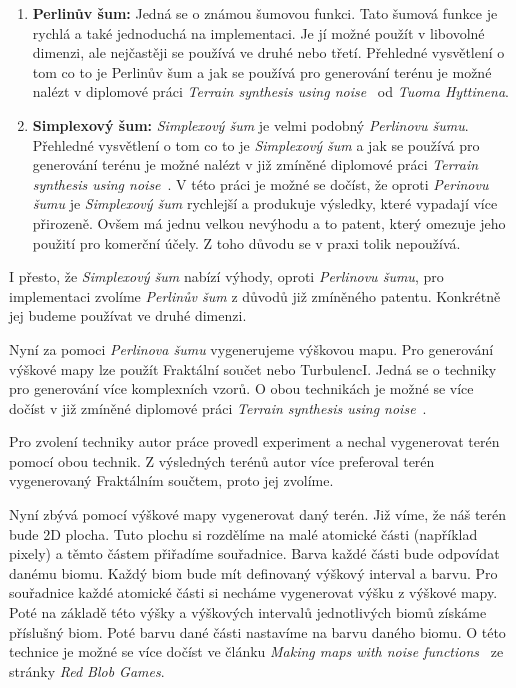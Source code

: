 \begin{enumerate}
    \item \textbf{Perlinův šum:} Jedná se o známou šumovou funkci. Tato šumová funkce je rychlá a také jednoduchá na implementaci. Je jí možné použít v libovolné dimenzi, ale nejčastěji se používá ve druhé nebo třetí. Přehledné vysvětlení o tom co to je Perlinův šum a jak se používá pro generování terénu je možné nalézt v diplomové práci \textit{Terrain synthesis using noise}~\cite{TerrainNoise} od \textit{Tuoma Hyttinena}.

    \item \textbf{Simplexový šum:} \textit{Simplexový šum} je velmi podobný \textit{Perlinovu šumu}. Přehledné vysvětlení o tom co to je \textit{Simplexový šum} a jak se používá pro generování terénu je možné nalézt v již zmíněné diplomové práci \textit{Terrain synthesis using noise}~\cite{TerrainNoise}. V této práci je možné se dočíst, že oproti \textit{Perinovu šumu} je \textit{Simplexový šum} rychlejší a produkuje výsledky, které vypadají více přirozeně. Ovšem má jednu velkou nevýhodu a to patent, který omezuje jeho použití pro komerční účely. Z toho důvodu se v praxi tolik nepoužívá.
\end{enumerate}

I přesto, že \textit{Simplexový šum} nabízí výhody, oproti \textit{Perlinovu šumu}, pro implementaci zvolíme \textit{Perlinův šum} z důvodů již zmíněného patentu. Konkrétně jej budeme používat ve druhé dimenzi.

Nyní za pomoci \textit{Perlinova šumu} vygenerujeme výškovou mapu. Pro generování výškové mapy lze použít Fraktální součet nebo TurbulencI. Jedná se o techniky pro generování více komplexních vzorů. O obou technikách je možné se více dočíst v již zmíněné diplomové práci \textit{Terrain synthesis using noise}~\cite{TerrainNoise}.

Pro zvolení techniky autor práce provedl experiment a nechal vygenerovat terén pomocí obou technik. Z výsledných terénů autor více preferoval terén vygenerovaný Fraktálním součtem, proto jej zvolíme.

Nyní zbývá pomocí výškové mapy vygenerovat daný terén. Již víme, že náš terén bude 2D plocha. Tuto plochu si rozdělíme na malé atomické části (například pixely) a těmto částem přiřadíme souřadnice. Barva každé části bude odpovídat danému biomu. Každý biom bude mít definovaný výškový interval a barvu. Pro souřadnice každé atomické části si necháme vygenerovat výšku z výškové mapy. Poté na základě této výšky a výškových intervalů jednotlivých biomů získáme příslušný biom. Poté barvu dané části nastavíme na barvu daného biomu. O této technice je možné se více dočíst ve článku \textit{Making maps with noise functions}~\cite{TerrainHeightMap} ze stránky \textit{Red Blob Games}.

